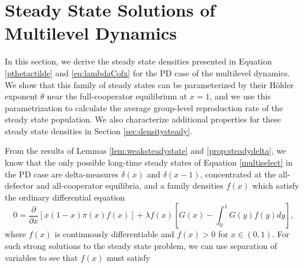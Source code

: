 \documentclass[11pt]{article}
\numberwithin{equation}{section}
\newcommand{\dsdel}[2]{\displaystyle\frac{\partial #1}{\partial #2}}
\begin{document}
{\section{Steady State Solutions of Multilevel Dynamics} \label{sec:steadystates}

In this section, we derive the steady state densities presented in Equation \eqref{pthetactilde} and \eqref{eq:lambdaCofx} for the PD case of the multilevel dynamics. We show that this family of steady states can be parameterized by their H{\"o}lder exponent $\theta$ near the full-cooperator equilibrium at $x=1$, and we use this parametrization to calculate the average group-level reproduction rate of the steady state population. We also characterize additional properties for these steady state densities in Section \ref{sec:densitysteady}.

From the results of Lemmas \ref{lem:weaksteadystate} and \ref{prop:steadydelta}, we know that the only possible long-time steady states of Equation \eqref{multiselect} in the PD case are delta-measures $\delta(x)$ and $\delta(x-1)$, concentrated at the all-defector and all-cooperator equilibria, and a family densities $f(x)$ which satisfy the ordinary differential equation
\begin{equation} \label{eq:timeindependentODE}
    0 = \dsdel{}{x} \left[ x (1-x) \pi(x) f(x) \right] + \lambda f(x) \left[ G(x) - \int_0^1 G(y) f(y) dy \right],
\end{equation}
where $f(x)$ is continuously differentiable and $f(x) > 0$ for $x \in (0,1)$. For such strong solutions to the steady state problem, we can use separation of variables to see that $f(x)$ must satisfy

}
\end{document}
